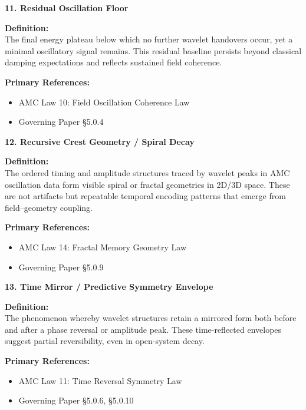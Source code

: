 \documentclass[10pt,aps,pre,onecolumn,superscriptaddress,notitlepage]{revtex4-2}
\begin{document}
\vspace{1em}

\noindent\textbf{11. Residual Oscillation Floor}

\textbf{Definition:} \\
The final energy plateau below which no further wavelet handovers occur, yet a minimal oscillatory signal remains. This residual baseline persists beyond classical damping expectations and reflects sustained field coherence.

\textbf{Primary References:}
\begin{itemize}[leftmargin=1.5em]
  \item AMC Law 10: Field Oscillation Coherence Law
  \item Governing Paper §5.0.4
\end{itemize}

\vspace{1em}

\noindent\textbf{12. Recursive Crest Geometry / Spiral Decay}

\textbf{Definition:} \\
The ordered timing and amplitude structures traced by wavelet peaks in AMC oscillation data form visible spiral or fractal geometries in 2D/3D space. These are not artifacts but repeatable temporal encoding patterns that emerge from field–geometry coupling.

\textbf{Primary References:}
\begin{itemize}[leftmargin=1.5em]
  \item AMC Law 14: Fractal Memory Geometry Law
  \item Governing Paper §5.0.9
\end{itemize}

\vspace{1em}

\noindent\textbf{13. Time Mirror / Predictive Symmetry Envelope}

\textbf{Definition:} \\
The phenomenon whereby wavelet structures retain a mirrored form both before and after a phase reversal or amplitude peak. These time-reflected envelopes suggest partial reversibility, even in open-system decay.

\textbf{Primary References:}
\begin{itemize}[leftmargin=1.5em]
  \item AMC Law 11: Time Reversal Symmetry Law
  \item Governing Paper §5.0.6, §5.0.10
\end{itemize}
\end{document}

